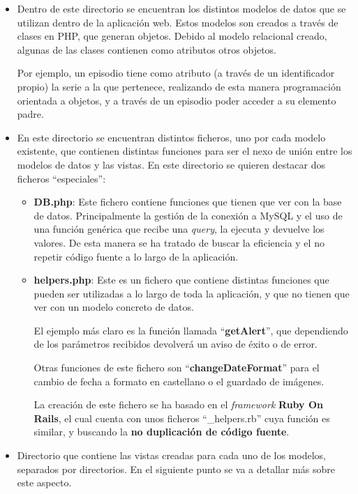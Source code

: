 \documentclass{\ClassPath/viu-tfm-template}
\begin{document}
\begin{itemize}
    \item {} Dentro de este directorio se encuentran los distintos modelos de datos que se utilizan dentro de la aplicación web. Estos modelos son creados a través de clases en PHP, que generan objetos. Debido al modelo relacional creado, algunas de las clases contienen como atributos otros objetos.

    Por ejemplo, un episodio tiene como atributo (a través de un identificador propio) la serie a la que pertenece, realizando de esta manera programación orientada a objetos, y a través de un episodio poder acceder a su elemento padre.

    \item {} En este directorio se encuentran distintos ficheros, uno por cada modelo existente, que contienen distintas funciones para ser el nexo de unión entre los modelos de datos y las vistas. En este directorio se quieren destacar dos ficheros “especiales”:
    \begin{itemize}
        \item \textbf{DB.php}: Este fichero contiene funciones que tienen que ver con la base de datos. Principalmente la gestión de la conexión a MySQL y el uso de una función genérica que recibe una \textit{query}, la ejecuta y devuelve los valores. De esta manera se ha tratado de buscar la eficiencia y el no repetir código fuente a lo largo de la aplicación.

        \item \textbf{helpers.php}: Este es un fichero que contiene distintas funciones que pueden ser utilizadas a lo largo de toda la aplicación, y que no tienen que ver con un modelo concreto de datos.

        El ejemplo más claro es la función llamada “\textbf{getAlert}”, que dependiendo de los parámetros recibidos devolverá un aviso de éxito o de error.

        Otras funciones de este fichero son “\textbf{changeDateFormat}” para el cambio de fecha a formato en castellano o el guardado de imágenes.

        La creación de este fichero se ha basado en el \textit{framework} \textbf{Ruby On Rails}, el cual cuenta con unos ficheros “\_helpers.rb” cuya función es similar, y buscando la \textbf{no duplicación de código fuente}.
    \end{itemize}

    \item {} Directorio que contiene las vistas creadas para cada uno de los modelos, separados por directorios. En el siguiente punto se va a detallar más sobre este aspecto.
\end{itemize}
\end{document}
